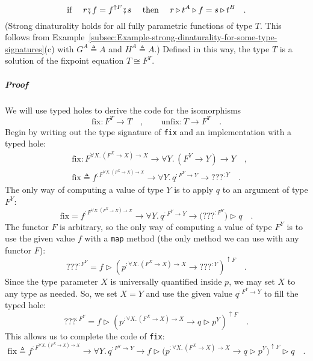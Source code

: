 \begin{equation}
\text{if }\quad r\bef f=f^{\uparrow F}\bef s\quad\text{ then }\quad r\triangleright t^{A}\triangleright f=s\triangleright t^{B}\quad.\label{eq:strong-dinaturality-for-church-encoded-fix-unfix}
\end{equation}
(Strong dinaturality holds for all fully parametric functions of type
$T$. This follows from Example~\ref{subsec:Example-strong-dinaturality-for-some-type-signatures}(c)
with $G^{A}\triangleq A$ and $H^{A}\triangleq A$.) Defined in this
way, the type $T$ is a solution of the fixpoint equation $T\cong F^{T}$.

\subparagraph{Proof}

We will use typed holes to derive the code for the isomorphisms
\[
\text{fix}:F^{T}\rightarrow T\quad,\quad\quad\text{unfix}:T\rightarrow F^{T}\quad.
\]
Begin by writing out the type signature of \lstinline!fix!
and an implementation with a typed hole:
\begin{align*}
 & \text{fix}:F^{\forall X.\,(F^{X}\rightarrow X)\rightarrow X}\rightarrow\forall Y.\,(F^{Y}\rightarrow Y)\rightarrow Y\quad,\\
 & \text{fix}\triangleq f^{:F^{\forall X.\,(F^{X}\rightarrow X)\rightarrow X}}\rightarrow\forall Y.\,q^{:F^{Y}\rightarrow Y}\rightarrow\text{???}^{:Y}\quad.
\end{align*}
The only way of computing a value of type $Y$ is to apply $q$ to
an argument of type $F^{Y}$:
\[
\text{fix}=f^{:F^{\forall X.\,(F^{X}\rightarrow X)\rightarrow X}}\rightarrow\forall Y.\,q^{:F^{Y}\rightarrow Y}\rightarrow\big(\text{???}^{:F^{Y}}\big)\triangleright q\quad.
\]
The functor $F$ is arbitrary, so the only way of computing a value
of type $F^{Y}$ is to use the given value $f$ with a \lstinline!map!
method (the only method we can use with any functor $F$):
\[
\text{???}^{:F^{Y}}=f\triangleright(p^{:\forall X.\,(F^{X}\rightarrow X)\rightarrow X}\rightarrow\text{???}^{:Y})^{\uparrow F}\quad.
\]
Since the type parameter $X$ is universally quantified inside $p$,
we may set $X$ to any type as needed. So, we set $X=Y$ and use the
given value $q^{:F^{Y}\rightarrow Y}$ to fill the typed hole:
\[
\text{???}^{:F^{Y}}=f\triangleright(p^{:\forall X.\,(F^{X}\rightarrow X)\rightarrow X}\rightarrow q\triangleright p^{Y})^{\uparrow F}\quad.
\]
This allows us to complete the code of \lstinline!fix!:
\[
\text{fix}\triangleq f^{:F^{\forall X.\,(F^{X}\rightarrow X)\rightarrow X}}\rightarrow\forall Y.\,q^{:F^{Y}\rightarrow Y}\rightarrow f\triangleright\big(p^{:\forall X.\,(F^{X}\rightarrow X)\rightarrow X}\rightarrow q\triangleright p^{Y}\big)^{\uparrow F}\triangleright q\quad.
\]

